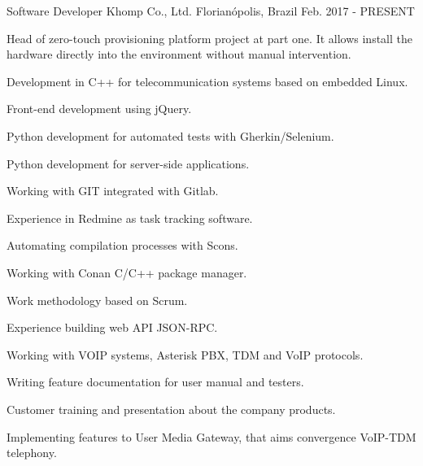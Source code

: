 

\begin{cventries}

  \cventry
    {Software Developer} %
    {Khomp Co., Ltd.} %
    {Florianópolis, Brazil} %
    {Feb. 2017 - PRESENT} %
    {
      \begin{cvitems} %
        \item {Head of zero-touch provisioning platform project at part one. It allows install the hardware directly into the environment without manual intervention.}
        \item {Development in C++ for telecommunication systems based on embedded Linux.}
        \item {Front-end development using jQuery.}
        \item {Python development for automated tests with Gherkin/Selenium.}
        \item {Python development for server-side applications.}
        \item {Working with GIT integrated with Gitlab.}
        \item {Experience in Redmine as task tracking software.}
        \item {Automating compilation processes with Scons.}
        \item {Working with Conan C/C++ package manager.}
        \item {Work methodology based on Scrum.}
        \item {Experience building web API JSON-RPC.}
        \item {Working with VOIP systems, Asterisk PBX, TDM and VoIP protocols.}
        \item {Writing feature documentation for user manual and testers.}
        \item {Customer training and presentation about the company products.}
        \item {Implementing features to User Media Gateway, that aims convergence VoIP-TDM telephony.}
      \end{cvitems}
    }


\end{cventries}

